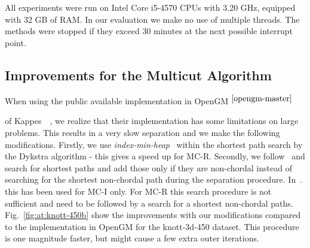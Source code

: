 \documentclass[10pt,twocolumn,letterpaper]{article}
\newcommand{\footref}[1]{%
    $^{\ref{#1}}$%
}
\theoremstyle{definition}
\begin{document}
All experiments were run on Intel Core i5-4570 CPUs
with 3.20 GHz, equipped with 32 GB of RAM.
In our evaluation we make no use of multiple threads.
The methods were stopped if they exceed 30 minutes at the next possible interrupt point.





\subsection{Improvements for the Multicut Algorithm}\label{sec:tunedMC} 
When using the  public available implementation in OpenGM\footref{opengm-master}
of Kappes~\etal~\cite{kappes_2013_arxiv}, we realize that their implementation has some limitations on large problems.
This results in a very slow separation and we make the following modifications.
Firstly, we use \emph{index-min-heap}~\cite{Sedgewick-2011} within the shortest path search by the Dykstra algorithm - this gives a speed up for MC-R.
Secondly, we follow~\cite{kroeger_2012_eccv} and search for shortest paths and add those only if they are non-chordal instead of searching for the shortest non-chordal path
during the separation procedure. 
In~\cite{kroeger_2012_eccv}. this has been used for MC-I only. 
For MC-R this search procedure is not sufficient and need to be followed by a search for a shortest non-chordal paths.
%
Fig.~\ref{fig:at:knott-450b} show the improvements with our modifications compared to the implementation in OpenGM for the knott-3d-450 dataset.
This procedure is one magnitude faster, but might cause a few extra outer iterations.
\end{document}
